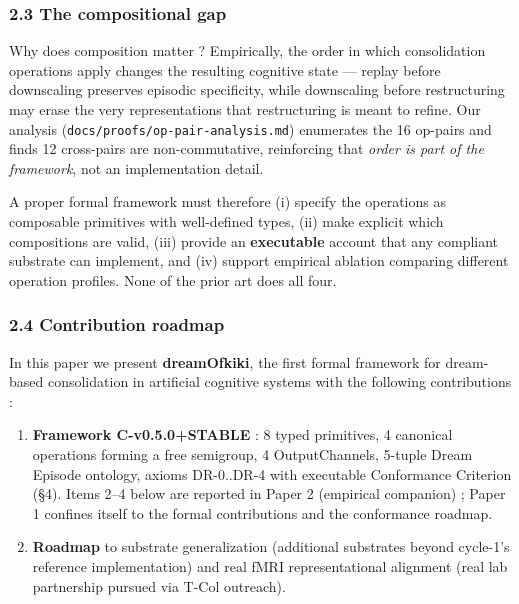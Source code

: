 \documentclass[
]{article}
\providecommand{\tightlist}{%
  \setlength{\itemsep}{0pt}\setlength{\parskip}{0pt}}
\begin{document}
\subsubsection{2.3 The compositional gap}\label{the-compositional-gap}

Why does composition matter ? Empirically, the order in which
consolidation operations apply changes the resulting cognitive state ---
replay before downscaling preserves episodic specificity, while
downscaling before restructuring may erase the very representations that
restructuring is meant to refine. Our analysis
(\texttt{docs/proofs/op-pair-analysis.md}) enumerates the 16 op-pairs
and finds 12 cross-pairs are non-commutative, reinforcing that
\emph{order is part of the framework}, not an implementation detail.

A proper formal framework must therefore (i) specify the operations as
composable primitives with well-defined types, (ii) make explicit which
compositions are valid, (iii) provide an \textbf{executable} account
that any compliant substrate can implement, and (iv) support empirical
ablation comparing different operation profiles. None of the prior art
does all four.

\subsubsection{2.4 Contribution roadmap}\label{contribution-roadmap}

In this paper we present \textbf{dreamOfkiki}, the first formal
framework for dream-based consolidation in artificial cognitive systems
with the following contributions :

\begin{enumerate}
\def\labelenumi{\arabic{enumi}.}
\tightlist
\item
  \textbf{Framework C-v0.5.0+STABLE} : 8 typed primitives, 4 canonical
  operations forming a free semigroup, 4 OutputChannels, 5-tuple Dream
  Episode ontology, axioms DR-0..DR-4 with executable Conformance
  Criterion (§4). Items 2--4 below are reported in Paper 2 (empirical
  companion) ; Paper 1 confines itself to the formal contributions and
  the conformance roadmap.
\item
  \textbf{Roadmap} to substrate generalization (additional substrates
  beyond cycle-1's reference implementation) and real fMRI
  representational alignment (real lab partnership pursued via T-Col
  outreach).
\end{enumerate}
\end{document}
